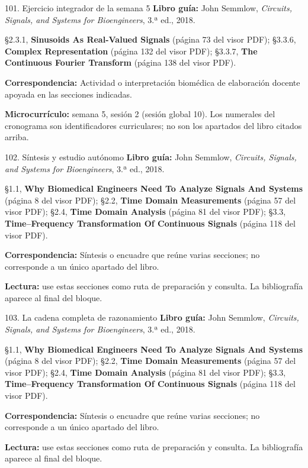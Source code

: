 \documentclass[
  10pt,
  ignorenonframetext,
  aspectratio=169,
  spanish,
]{beamer}
\begin{document}
\begin{frame}{101. Ejercicio integrador de la semana 5}
\label{ejercicio-integrador-de-la-semana-5}
\textbf{Libro guía:} John Semmlow, \emph{Circuits, Signals, and Systems
for Bioengineers}, 3.ª ed., 2018.

§2.3.1, \textbf{Sinusoids As Real-Valued Signals} (página 73 del visor
PDF); §3.3.6, \textbf{Complex Representation} (página 132 del visor
PDF); §3.3.7, \textbf{The Continuous Fourier Transform} (página 138 del
visor PDF).

\textbf{Correspondencia:} Actividad o interpretación biomédica de
elaboración docente apoyada en las secciones indicadas.

\textbf{Microcurrículo:} semana 5, sesión 2 (sesión global 10). Los
numerales del cronograma son identificadores curriculares; no son los
apartados del libro citados arriba.
\end{frame}

\begin{frame}{102. Síntesis y estudio autónomo}
\label{suxedntesis-y-estudio-autuxf3nomo}
\textbf{Libro guía:} John Semmlow, \emph{Circuits, Signals, and Systems
for Bioengineers}, 3.ª ed., 2018.

§1.1, \textbf{Why Biomedical Engineers Need To Analyze Signals And
Systems} (página 8 del visor PDF); §2.2, \textbf{Time Domain
Measurements} (página 57 del visor PDF); §2.4, \textbf{Time Domain
Analysis} (página 81 del visor PDF); §3.3, \textbf{Time--Frequency
Transformation Of Continuous Signals} (página 118 del visor PDF).

\textbf{Correspondencia:} Síntesis o encuadre que reúne varias
secciones; no corresponde a un único apartado del libro.

\textbf{Lectura:} use estas secciones como ruta de preparación y
consulta. La bibliografía aparece al final del bloque.
\end{frame}

\begin{frame}{103. La cadena completa de razonamiento}
\label{la-cadena-completa-de-razonamiento}
\textbf{Libro guía:} John Semmlow, \emph{Circuits, Signals, and Systems
for Bioengineers}, 3.ª ed., 2018.

§1.1, \textbf{Why Biomedical Engineers Need To Analyze Signals And
Systems} (página 8 del visor PDF); §2.2, \textbf{Time Domain
Measurements} (página 57 del visor PDF); §2.4, \textbf{Time Domain
Analysis} (página 81 del visor PDF); §3.3, \textbf{Time--Frequency
Transformation Of Continuous Signals} (página 118 del visor PDF).

\textbf{Correspondencia:} Síntesis o encuadre que reúne varias
secciones; no corresponde a un único apartado del libro.

\textbf{Lectura:} use estas secciones como ruta de preparación y
consulta. La bibliografía aparece al final del bloque.
\end{frame}
\end{document}
